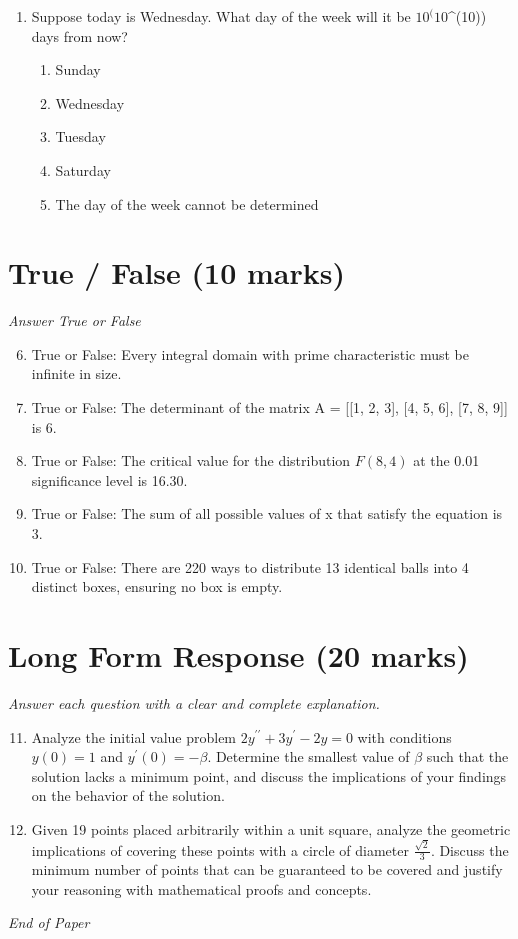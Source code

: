 \documentclass[12pt]{article}
\begin{document}
\begin{enumerate}[label=\arabic*.]
\begin{enumerate}[label=(\alph*)]
    \item E(X + Y) = 312, var(X + Y) = 14
\end{enumerate}
\item Suppose today is Wednesday. What day of the week will it be $10^(10$^(10)) days from now?
\begin{enumerate}[label=(\alph*)]
    \item Sunday
    \item Wednesday
    \item Tuesday
    \item Saturday
    \item The day of the week cannot be determined
\end{enumerate}
\end{enumerate}

\section*{True / False (10 marks)}
\textit{Answer True or False}
\begin{enumerate}[label=\arabic*.]
\setcounter{enumi}{5}
\item True or False: Every integral domain with prime characteristic must be infinite in size.
\item True or False: The determinant of the matrix A = [[1, 2, 3], [4, 5, 6], [7, 8, 9]] is 6.
\item True or False: The critical value for the distribution $F(8,4)$ at the 0.01 significance level is 16.30.
\item True or False: The sum of all possible values of x that satisfy the equation is 3.
\item True or False: There are 220 ways to distribute 13 identical balls into 4 distinct boxes, ensuring no box is empty.
\end{enumerate}

\section*{Long Form Response (20 marks)}
\textit{Answer each question with a clear and complete explanation.}
\begin{enumerate}[label=\arabic*.]
\setcounter{enumi}{10}
\item Analyze the initial value problem \( 2 y^{\prime \prime}+3 y^{\prime}-2 y=0 \) with conditions \( y(0)=1 \) and \( y^{\prime}(0)=-\beta \). Determine the smallest value of \( \beta \) such that the solution lacks a minimum point, and discuss the implications of your findings on the behavior of the solution.
\item Given 19 points placed arbitrarily within a unit square, analyze the geometric implications of covering these points with a circle of diameter $\frac{\sqrt{2}}{3}$. Discuss the minimum number of points that can be guaranteed to be covered and justify your reasoning with mathematical proofs and concepts.
\end{enumerate}

\vfill
\noindent\textit{End of Paper}
\end{document}
